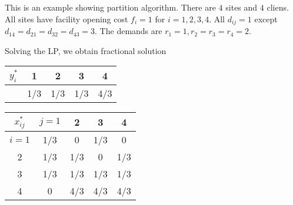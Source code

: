 \documentclass{article}
\begin{document}
This is an example showing partition algorithm. There are $4$ sites
and $4$ cliens. All sites have facility opening cost $f_i=1$ for
$i=1,2,3,4$. All $d_{ij}=1$ except $d_{14} = d_{21} = d_{32} = d_{43}
= 3$. The demands are $r_1=1, r_2=r_3=r_4=2$.

Solving the LP, we obtain fractional solution
\begin{table}[ht,center]
  \begin{subtable}{0.5\textwidth}
  \centering
  \begin{tabular}{c | c c c c}
    $y_i^\ast$ & 1 & 2 & 3 & 4\\
    \hline
    & 1/3 & 1/3 & 1/3 & 4/3\\
  \end{tabular}
\end{subtable}
%
\begin{subtable}{0.5\textwidth}
  \centering
  \begin{tabular}{c | c c c c}
    $x_{ij}^\ast$ & $j=1$ & 2 & 3 & 4\\
    \hline
    $i=1$ & 1/3 & 0   & 1/3 & 0\\
    2 & 1/3 & 1/3 & 0   & 1/3\\
    3 & 1/3 & 1/3 & 1/3 & 1/3\\
    4 & 0   & 4/3 & 4/3 & 4/3\\
  \end{tabular}
\end{subtable}
\end{table}
\end{document}
